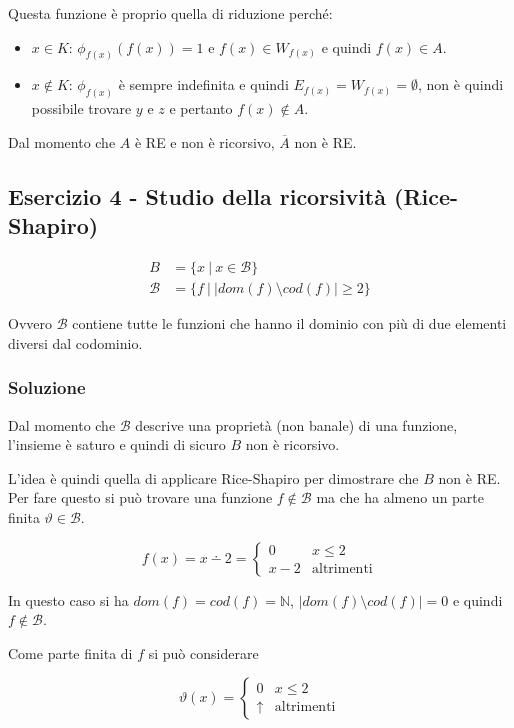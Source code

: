 Questa funzione è proprio quella di riduzione perché:

\begin{itemize}
	\item $x \in K$: $\phi_{f(x)}(f(x)) = 1$ e $f(x) \in W_{f(x)}$ e quindi $f(x) \in A$.
	\item $x \notin K$: $\phi_{f(x)}$ è sempre indefinita e quindi $E_{f(x)} = W_{f(x)} = \emptyset$, non è quindi possibile trovare $y$ e $z$ e pertanto $f(x) \notin A$.
\end{itemize}

Dal momento che $A$ è RE e non è ricorsivo, $\overline{A}$ non è RE.

\subsection{Esercizio 4 - Studio della ricorsività (Rice-Shapiro)}

\begin{align*}
	B &= \{ x \:| \: x \in \mathcal{B} \} \\
	\mathcal{B} &= \{ f \: |\: |dom(f) \setminus cod(f) | \geq 2 \}
\end{align*}

Ovvero $\mathcal{B}$ contiene tutte le funzioni che hanno il dominio con più di due elementi diversi dal codominio.

\subsubsection{Soluzione}

Dal momento che $\mathcal{B}$ descrive una proprietà (non banale) di una funzione, l'insieme è saturo e quindi di sicuro $B$ non è ricorsivo.

L'idea è quindi quella di applicare Rice-Shapiro per dimostrare che $B$ non è RE. Per fare questo si può trovare una funzione $f \notin \mathcal{B}$ ma che ha almeno un parte finita $\vartheta \in \mathcal{B}$.

$$
f(x) = x \dotminus 2 = \begin{cases}
0 &x \leq 2 \\
x -2 &\text{altrimenti}
\end{cases}
$$

In questo caso si ha $dom(f) = cod(f) = \mathbb{N}$, $| dom(f) \setminus cod(f)| = 0$ e quindi $f \notin \mathcal{B}$.

Come parte finita di $f$ si può considerare

$$
\vartheta(x) = \begin{cases}
0 & x \leq 2 \\
\uparrow &\text{altrimenti}
\end{cases}
$$


